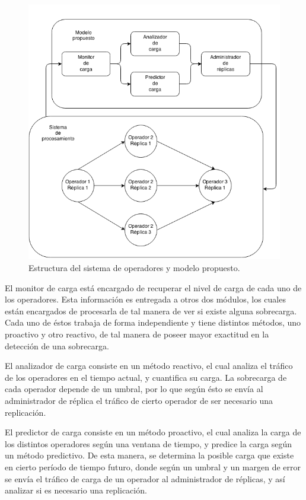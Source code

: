 \begin{figure}[ht!]
  \centering
    \includegraphics[scale=0.5]{images/Diagrama.png}
  \caption{Estructura del sistema de operadores y modelo propuesto.}
  \label{fig:opt}
\end{figure}

El monitor de carga está encargado de recuperar el nivel de carga de cada uno de los operadores. Esta información es entregada a otros dos módulos, los cuales están encargados de procesarla de tal manera de ver si existe alguna sobrecarga. Cada uno de éstos trabaja de forma independiente y tiene distintos métodos, uno proactivo y otro reactivo, de tal manera de poseer mayor exactitud en la detección de una sobrecarga.

El analizador de carga consiste en un método reactivo, el cual analiza el tráfico de los operadores en el tiempo actual, y cuantifica su carga. La sobrecarga de cada operador depende de un umbral, por lo que según ésto se envía al administrador de réplica el tráfico de cierto operador de ser necesario una replicación.

El predictor de carga consiste en un método proactivo, el cual analiza la carga de los distintos operadores según una ventana de tiempo, y predice la carga según un método predictivo. De esta manera, se determina la posible carga que existe en cierto período de tiempo futuro, donde según un umbral y un margen de error se envía el tráfico de carga de un operador al administrador de réplicas, y así analizar si es necesario una replicación.

